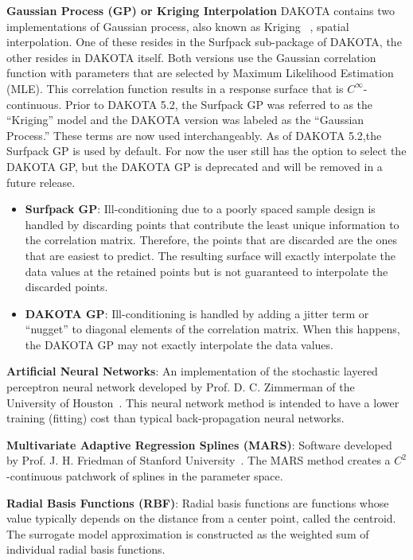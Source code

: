 \textbf{Gaussian Process (GP) or Kriging Interpolation}
DAKOTA contains two implementations of Gaussian process, also known as 
Kriging ~\cite{Giu98}, spatial interpolation.  One of these resides in 
the Surfpack sub-package of DAKOTA, the other resides in DAKOTA itself.
Both versions use the Gaussian correlation function with parameters that
are selected by Maximum Likelihood Estimation (MLE). This correlation 
function results in a response surface that is $C^\infty$-continuous.
Prior to DAKOTA 5.2, the Surfpack GP was referred to as the ``Kriging'' 
model and the DAKOTA version was labeled as the ``Gaussian Process.''  
These terms are now used interchangeably.  As of DAKOTA 5.2,the 
Surfpack GP is used by default.  For now the user still has the option 
to select the DAKOTA GP, but the DAKOTA GP is deprecated and will be 
removed in a future release.
\begin{itemize}
\item \textbf{Surfpack GP}: Ill-conditioning due to a poorly spaced sample 
      design is handled by discarding points that contribute the least 
      unique information to the correlation matrix.  Therefore, the points 
      that are discarded are the ones that are easiest to predict.  The 
      resulting surface will exactly interpolate the data values at the 
      retained points but is not guaranteed to interpolate the discarded 
      points.
\item \textbf{DAKOTA GP}: Ill-conditioning is handled by adding a jitter 
      term or ``nugget'' to diagonal elements of the correlation matrix. 
      When this happens, the DAKOTA GP may not exactly interpolate the 
      data values.
\end{itemize}

\textbf{Artificial Neural Networks}: An implementation of the
stochastic layered perceptron neural network developed by Prof. D. C.
Zimmerman of the University of Houston~\cite{Zim96}. This neural network
method is intended to have a lower training (fitting) cost than
typical back-propagation neural networks.

\textbf{Multivariate Adaptive Regression Splines (MARS)}: Software
developed by Prof. J. H. Friedman of Stanford University~\cite{Fri91}.
The MARS method creates a $C^2$-continuous patchwork of splines in the
parameter space.

\textbf{Radial Basis Functions (RBF)}:  Radial basis functions are 
functions whose value typically depends on the distance from a center point, 
called the centroid.  The surrogate model approximation is constructed
as the weighted sum of individual radial basis functions. 

